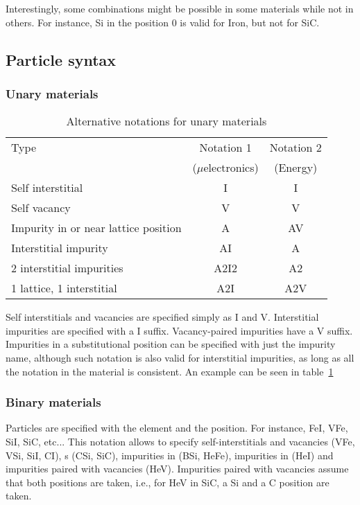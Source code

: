 Interestingly, some combinations might be possible in some materials while not in others. For instance, Si in the position 0 is valid for Iron, but not for SiC.

\subsection{Particle syntax}

\subsubsection{Unary materials}

\begin{table}
\caption{Alternative notations for unary materials}
\label{tab:alternative}
\begin{center}
\begin{tabular}{l|c|c}
Type & Notation 1 & Notation 2 \\
     & ($\mu$electronics) & (Energy) \\\hline
Self interstitial & I & I \\
Self vacancy      & V & V \\\hline
Impurity in or near lattice position & A & AV \\
Interstitial impurity & AI & A \\\hline
2 interstitial impurities & A2I2 & A2 \\
1 lattice, 1 interstitial & A2I & A2V \\\hline
\end{tabular}
\end{center}
\end{table}

Self interstitials and vacancies are specified simply as I and V. Interstitial impurities are specified with a I suffix. Vacancy-paired impurities have a V suffix. Impurities in a substitutional position can be specified with just the impurity name, although such notation is also valid for interstitial impurities, as long as all the notation in the material is consistent. An example can be seen in table~\ref{tab:alternative}


\subsubsection{Binary materials}

Particles are specified with the element and the position. For instance, FeI, VFe, SiI, SiC, etc... This notation allows to specify self-interstitials and vacancies (VFe, VSi, SiI, CI), s (CSi, SiC), impurities in  (BSi, HeFe), impurities in  (HeI) and impurities paired with vacancies (HeV). Impurities paired with vacancies assume that both positions are taken, i.e., for HeV in SiC, a Si and a C position are taken.

